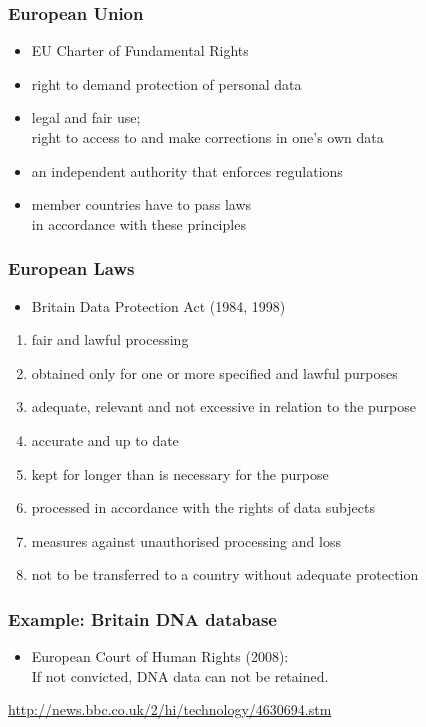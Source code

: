 \documentclass[dvipsnames]{beamer}
\theoremstyle{plain}
\begin{document}
\begin{frame}
  \frametitle{European Union}

  \begin{itemize}
    \item EU Charter of Fundamental Rights

    \smallskip
    \item right to demand protection of personal data
    \item legal and fair use;\\
      right to access to and make corrections in one's own data
    \item an independent authority that enforces regulations

    \bigskip
    \item member countries have to pass laws\\
      in accordance with these principles
  \end{itemize}
\end{frame}

\begin{frame}
  \frametitle{European Laws}

  \begin{itemize}
   \item Britain Data Protection Act (1984, 1998)
  \end{itemize}

  \begin{enumerate}
    \item fair and lawful processing
    \item obtained only for one or more specified and lawful purposes
    \item adequate, relevant and not excessive in relation to the purpose
    \item accurate and up to date
    \item kept for longer than is necessary for the purpose
    \item processed in accordance with the rights of data subjects
    \item measures against unauthorised processing and loss
    \item not to be transferred to a country without adequate protection
  \end{enumerate}
\end{frame}

\begin{frame}
  \frametitle{Example: Britain DNA database}

  \begin{center}
  \end{center}

  \begin{itemize}
    \item European Court of Human Rights (2008):\\
    If not convicted, DNA data can not be retained.
  \end{itemize}

  \medskip
  \tiny{\url{http://news.bbc.co.uk/2/hi/technology/4630694.stm}}\\
\end{frame}
\end{document}
